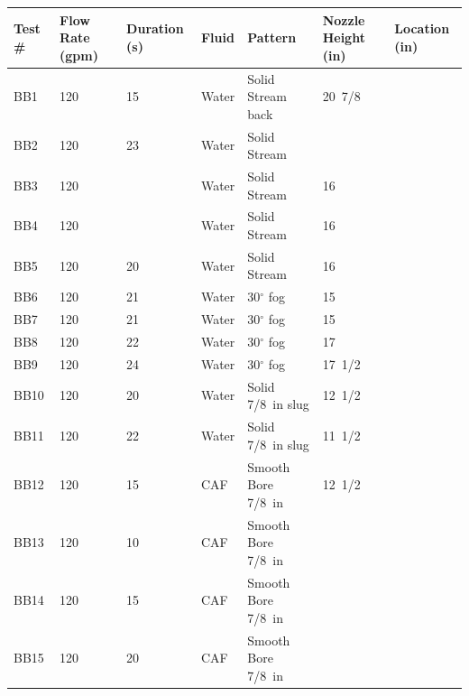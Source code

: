 \documentclass[12pt,oneside]{book}
\begin{document}
\begin{table}[!ht]
\footnotesize
\centering
{}\label{tab:spray_density_tests}
\begin{tabular}{lllllll}
\toprule[1.5pt]
Test \#    &   Flow Rate (gpm)  & Duration (s)  & Fluid  &  Pattern            & Nozzle Height (in) & Location (in) \\
\midrule
BB1        &   120              & 15            & Water  &  Solid Stream back  & 20~7/8             &          \\
BB2        &   120              & 23            & Water  &  Solid Stream       &                    &          \\
BB3        &   120              &               & Water  &  Solid Stream       & 16                 &          \\
BB4        &   120              &               & Water  &  Solid Stream       & 16                 &          \\
BB5        &   120              & 20            & Water  &  Solid Stream       & 16                 &          \\
BB6        &   120              & 21            & Water  &  30$^{\circ}$ fog   & 15                 &          \\
BB7        &   120              & 21            & Water  &  30$^{\circ}$ fog   & 15                 &          \\
BB8        &   120              & 22            & Water  &  30$^{\circ}$ fog   & 17                 &          \\
BB9        &   120              & 24            & Water  &  30$^{\circ}$ fog   & 17~1/2             &          \\
BB10       &   120              & 20            & Water  &  Solid 7/8~in slug  & 12~1/2             &          \\
BB11       &   120              & 22            & Water  &  Solid 7/8~in slug  & 11~1/2             &          \\
BB12       &   120              & 15            & CAF    &  Smooth Bore 7/8~in & 12~1/2             &          \\
BB13       &   120              & 10            & CAF    &  Smooth Bore 7/8~in &                    &          \\
BB14       &   120              & 15            & CAF    &  Smooth Bore 7/8~in &                    &          \\
BB15       &   120              & 20            & CAF    &  Smooth Bore 7/8~in &                    &          \\

\end{tabular}
\end{table}
\end{document}

